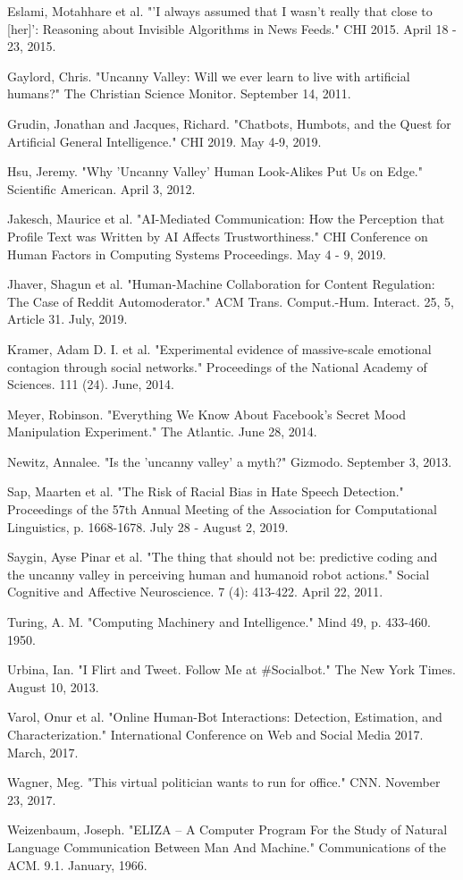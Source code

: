 \documentclass[class=book, crop=false]{standalone}
\begin{document}
Eslami, Motahhare et al. "'I always assumed that I wasn't really that close to [her]': Reasoning about Invisible Algorithms in News Feeds." CHI 2015. April 18 - 23, 2015.

Gaylord, Chris. "Uncanny Valley: Will we ever learn to live with artificial humans?" The Christian Science Monitor. September 14, 2011.

Grudin, Jonathan and Jacques, Richard. "Chatbots, Humbots, and the Quest for Artificial General Intelligence." CHI 2019. May 4-9, 2019.

Hsu, Jeremy. "Why 'Uncanny Valley' Human Look-Alikes Put Us on Edge." Scientific American. April 3, 2012.

Jakesch, Maurice et al. "AI-Mediated Communication: How the Perception that Profile Text was Written by AI Affects Trustworthiness." CHI Conference on Human Factors in Computing Systems Proceedings. May 4 - 9, 2019.

Jhaver, Shagun et al. "Human-Machine Collaboration for Content Regulation: The Case of Reddit Automoderator." ACM Trans. Comput.-Hum. Interact. 25, 5, Article 31. July, 2019.

Kramer, Adam D. I. et al. "Experimental evidence of massive-scale emotional contagion through social networks." Proceedings of the National Academy of Sciences. 111 (24). June, 2014.

Meyer, Robinson. "Everything We Know About Facebook's Secret Mood Manipulation Experiment." The Atlantic. June 28, 2014.

Newitz, Annalee. "Is the 'uncanny valley' a myth?" Gizmodo. September 3, 2013.

Sap, Maarten et al. "The Risk of Racial Bias in Hate Speech Detection." Proceedings of the 57th Annual Meeting of the Association for Computational Linguistics, p. 1668-1678. July 28 - August 2, 2019.

Saygin, Ayse Pinar et al. "The thing that should not be: predictive coding and the uncanny valley in perceiving human and humanoid robot actions." Social Cognitive and Affective Neuroscience. 7 (4): 413-422. April 22, 2011.

Turing, A. M. "Computing Machinery and Intelligence." Mind 49, p. 433-460. 1950.

Urbina, Ian. "I Flirt and Tweet. Follow Me at \#Socialbot." The New York Times. August 10, 2013.

Varol, Onur et al. "Online Human-Bot Interactions: Detection, Estimation, and Characterization." International Conference on Web and Social Media 2017. March, 2017.

Wagner, Meg. "This virtual politician wants to run for office." CNN. November 23, 2017.

Weizenbaum, Joseph. "ELIZA -- A Computer Program For the Study of Natural Language Communication Between Man And Machine." Communications of the ACM. 9.1. January, 1966.
\end{document}
